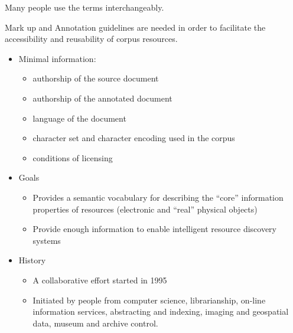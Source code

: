 \documentclass[a4paper,landscape,headrule,footrule,dvips]{foils}
\begin{document}
\begin{CJK}{UTF8}{min}
Many people use the terms interchangeably.



Mark up and Annotation guidelines are needed in order to
facilitate the accessibility and reusability of corpus
resources.
\begin{itemize}
\item Minimal information:
  \begin{itemize}
  \item authorship of the source document
  \item authorship of the annotated document
  \item language of the document
  \item character set and character encoding used in the corpus
  \item conditions of licensing
  \end{itemize}
\end{itemize}

\begin{itemize}
\item Goals
\begin{itemize}
\item Provides a semantic vocabulary for describing the
``core'' information properties of resources (electronic
and ``real'' physical objects)
\item Provide enough information to enable intelligent
resource discovery systems

\end{itemize}

\item History
\begin{itemize}
\item A collaborative effort started in 1995
\item Initiated by people from computer science,
librarianship, on-line information services, abstracting
and indexing, imaging and geospatial data, museum
and archive control.
\end{itemize}
\end{itemize}




\end{CJK}
\end{document}
